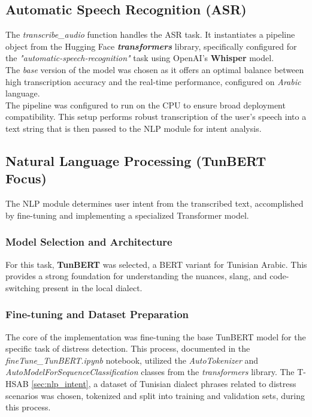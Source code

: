 \documentclass[12pt,a4paper,oneside,english]{book}
\begin{document}
\subsection{Automatic Speech Recognition (ASR)}
\label{subsec:asr_implementation}
The \textit{transcribe\_audio} function handles the ASR task. It instantiates a pipeline object from the Hugging Face \textbf{\textit{transformers}} library, specifically configured for the \textit{"automatic-speech-recognition"} task using OpenAI's \textbf{Whisper} model.
\\The \textit{base} version of the model was chosen as it offers an optimal balance between high transcription accuracy and the real-time performance, configured on \textit{Arabic} language.
\\The pipeline was configured to run on the CPU to ensure broad deployment compatibility. 
This setup performs robust transcription of the user's speech into a text string that is then passed to the NLP module for intent analysis.

\subsection{Natural Language Processing (TunBERT Focus)}
\label{sec:nlp_tunbert_implementation}
The NLP module determines user intent from the transcribed text, accomplished by fine-tuning and implementing a specialized Transformer model.

\subsubsection{Model Selection and Architecture}
\label{sec:tunbert selection}
For this task, \textbf{TunBERT} was selected, a BERT variant for Tunisian Arabic. This provides a strong foundation for understanding the nuances, slang, and code-switching present in the local dialect.

\subsubsection{Fine-tuning and Dataset Preparation}
\label{sec:finetuning tunbert}
The core of the implementation was fine-tuning the base TunBERT model for the specific task of distress detection. This process, documented in the \textit{fineTune\_TunBERT.ipynb} notebook, 
utilized the \textit{AutoTokenizer} and \textit{AutoModelForSequenceClassification} classes from the \textit{transformers} library. 
The T- HSAB \ref{sec:nlp_intent}, a dataset of Tunisian dialect phrases related to distress scenarios was chosen, tokenized and split into training and validation sets, during this process. 
\end{document}
